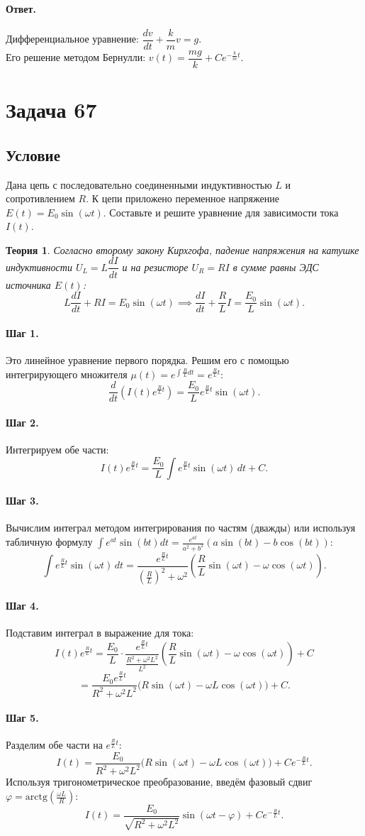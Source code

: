 \documentclass[12pt,a4paper]{article}
\theoremstyle{solution}
\newtheorem*{theory}{Теория}
\newcommand{\task}[1]{\newpage\section*{Задача #1}}
\newcommand{\answer}{\paragraph{Ответ.}}
\newcommand{\step}[1]{\paragraph{Шаг #1.}}
\begin{document}
\answer
Дифференциальное уравнение: $\dfrac{dv}{dt} + \dfrac{k}{m}v = g$. \\
Его решение методом Бернулли: $v(t) = \dfrac{mg}{k} + C e^{-\frac{k}{m}t}$.

\task{67}
\subsection*{Условие}
Дана цепь с последовательно соединенными индуктивностью $L$ и сопротивлением $R$. К цепи приложено переменное напряжение $E(t) = E_0 \sin(\omega t)$. Составьте и решите уравнение для зависимости тока $I(t)$.

\begin{theory}
Согласно второму закону Кирхгофа, падение напряжения на катушке индуктивности $U_L = L \dfrac{dI}{dt}$ и на резисторе $U_R = RI$ в сумме равны ЭДС источника $E(t)$:
\[
L \frac{dI}{dt} + R I = E_0 \sin(\omega t) \implies \frac{dI}{dt} + \frac{R}{L} I = \frac{E_0}{L} \sin(\omega t).
\]
\end{theory}

\step{1} Это линейное уравнение первого порядка. Решим его с помощью интегрирующего множителя $\mu(t) = e^{\int \frac{R}{L} dt} = e^{\frac{R}{L}t}$:
\[
\frac{d}{dt}\left( I(t) e^{\frac{R}{L}t} \right) = \frac{E_0}{L} e^{\frac{R}{L}t} \sin(\omega t).
\]

\step{2} Интегрируем обе части:
\[
I(t) e^{\frac{R}{L}t} = \frac{E_0}{L} \int e^{\frac{R}{L}t} \sin(\omega t)\,dt + C.
\]

\step{3} Вычислим интеграл методом интегрирования по частям (дважды) или используя табличную формулу $\int e^{at}\sin(bt)dt = \frac{e^{at}}{a^2+b^2}(a\sin(bt) - b\cos(bt))$:
\[
\int e^{\frac{R}{L}t} \sin(\omega t)\,dt = \frac{e^{\frac{R}{L}t}}{\left(\frac{R}{L}\right)^2 + \omega^2} \left( \frac{R}{L} \sin(\omega t) - \omega \cos(\omega t) \right).
\]

\step{4} Подставим интеграл в выражение для тока:
\[
I(t) e^{\frac{R}{L}t} = \frac{E_0}{L} \cdot \frac{e^{\frac{R}{L}t}}{\frac{R^2 + \omega^2 L^2}{L^2}} \left( \frac{R}{L} \sin(\omega t) - \omega \cos(\omega t) \right) + C
\]
\[
= \frac{E_0 e^{\frac{R}{L}t}}{R^2 + \omega^2 L^2} \Big( R \sin(\omega t) - \omega L \cos(\omega t) \Big) + C.
\]

\step{5} Разделим обе части на $e^{\frac{R}{L}t}$:
\[
I(t) = \frac{E_0}{R^2 + \omega^2 L^2} \Big( R \sin(\omega t) - \omega L \cos(\omega t) \Big) + C e^{-\frac{R}{L}t}.
\]
Используя тригонометрическое преобразование, введём фазовый сдвиг $\varphi = \mathrm{arctg}\left(\frac{\omega L}{R}\right)$:
\[
I(t) = \frac{E_0}{\sqrt{R^2 + \omega^2 L^2}} \sin(\omega t - \varphi) + C e^{-\frac{R}{L}t}.
\]
\end{document}
